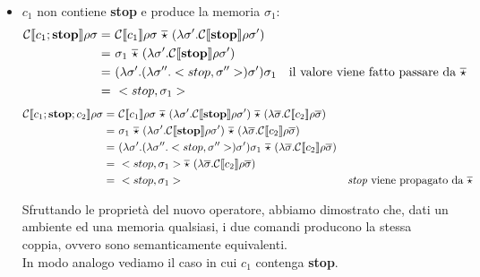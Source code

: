     \begin{itemize}
        \item $c_1$ non contiene \textbf{stop} e produce la memoria $\sigma_1$:
            \begin{align*}
                \mathcal{C}\doublebracket{c_1;\mbox{\textbf{stop}}}\rho\sigma =\ & \mathcal{C}\doublebracket{c_1}\rho\sigma\ \overline{\star}\ (\lambda\sigma'.\mathcal{C}\doublebracket{\mbox{\textbf{stop}}}\rho\sigma')\\
                =\ & \sigma_1\ \overline{\star}\ (\lambda\sigma'.\mathcal{C}\doublebracket{\mbox{\textbf{stop}}}\rho\sigma')\\
                =\ & (\lambda\sigma'.(\lambda\sigma''.<stop,\sigma''>)\sigma')\sigma_1 &\mbox{il valore viene fatto passare da $\overline{\star}$}\\
                =\ & <stop,\sigma_1>
            \end{align*}
            \begin{align*}
                \mathcal{C}\doublebracket{c_1;\mbox{\textbf{stop}};c_2}\rho\sigma =\ & \mathcal{C}\doublebracket{c_1}\rho\sigma\ \overline{\star}\ (\lambda\sigma'.\mathcal{C}\doublebracket{\mbox{\textbf{stop}}}\rho\sigma')\ \overline{\star}\ (\lambda\overline{\sigma}.\mathcal{C}\doublebracket{c_2}\rho\overline{\sigma})\\
                =\ & \sigma_1\ \overline{\star}\ (\lambda\sigma'.\mathcal{C}\doublebracket{\mbox{\textbf{stop}}}\rho\sigma')\ \overline{\star}\ (\lambda\overline{\sigma}.\mathcal{C}\doublebracket{c_2}\rho\overline{\sigma})\\
                =\ & (\lambda\sigma'.(\lambda\sigma''.<stop,\sigma''>)\sigma')\sigma_1\ \overline{\star}\ (\lambda\overline{\sigma}.\mathcal{C}\doublebracket{c_2}\rho\overline{\sigma})\\
                =\ & <stop,\sigma_1> \overline{\star}\ (\lambda\overline{\sigma}.\mathcal{C}\doublebracket{c_2}\rho\overline{\sigma})\\
                =\ & <stop,\sigma_1> &\mbox{\textit{stop} viene propagato da $\overline{\star}$}
            \end{align*}
            
            Sfruttando le proprietà del nuovo operatore, abbiamo dimostrato che, dati un ambiente ed una memoria qualsiasi, i due comandi producono la stessa coppia, ovvero sono semanticamente equivalenti.\\
            In modo analogo vediamo il caso in cui $c_1$ contenga \textbf{stop}.
            

\end{itemize}
